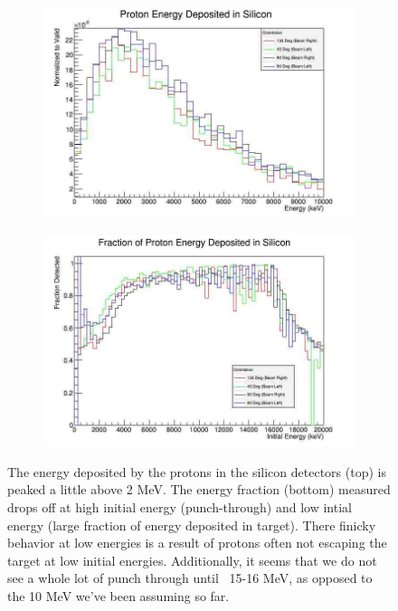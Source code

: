 \documentclass[a4paper]{article}
\begin{document}
\begin{figure}
  \begin{subfigure}[t]{0.45\textwidth}
    \includegraphics[scale=0.5]{plots/prot_e}
  \end{subfigure}
  
  \begin{subfigure}[t]{0.45\textwidth}
    \includegraphics[scale=0.5]{plots/prot_frac}
  \end{subfigure}
  \caption{The energy deposited by the protons in the silicon detectors (top)
    is peaked a little above 2 MeV. The energy fraction (bottom)
    measured drops off at high initial energy (punch-through)
    and low intial energy (large fraction of energy deposited in target).
    There finicky behavior at low energies is a result of protons often not
    escaping the target at low initial energies. Additionally, it seems
    that we do not see a whole lot of punch through until ~15-16 MeV, as
    opposed to the 10 MeV we've been assuming so far.}
  \label{fig:prot_e}
\end{figure}
\end{document}
